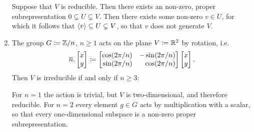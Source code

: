 \begin{example}
\begin{enumerate}
      Suppose that $V$ is reducible.
      Then there exists an non-zero, proper subrepresentation $0 \subsetneq U \subsetneq V$.
      Then there exists some non-zero $v \in U$, for which it follows that $\left\langle v \right\rangle \subseteq U \subsetneq V$, so that $v$ does not generate $V$.
    \item
      The group $G \coloneqq \mathbb{Z}/n$, $n \geq 1$ acts on the plane $V \coloneqq \mathbb{R}^2$ by rotation, i.e.
      \[
                  \overline{n}.\vect{x \\ y}
        \defined  \begin{bmatrix*}[r]
                    \cos(2\pi/n)  & -\sin(2\pi/n) \\
                    \sin(2\pi/n)  &  \cos(2\pi/n)
                  \end{bmatrix*}
                  \vect{x \\ y}.
      \]
      Then $V$ is irreducible if and only if $n \geq 3$:
      
      For $n = 1$ the action is trivial, but $V$ is two-dimensional, and therefore reducible.
      For $n = 2$ every element $g \in G$ acts by multiplication with a scalar, so that every one-dimensional subspace is a non-zero proper subrepresentation.
      

\end{enumerate}
\end{example}
